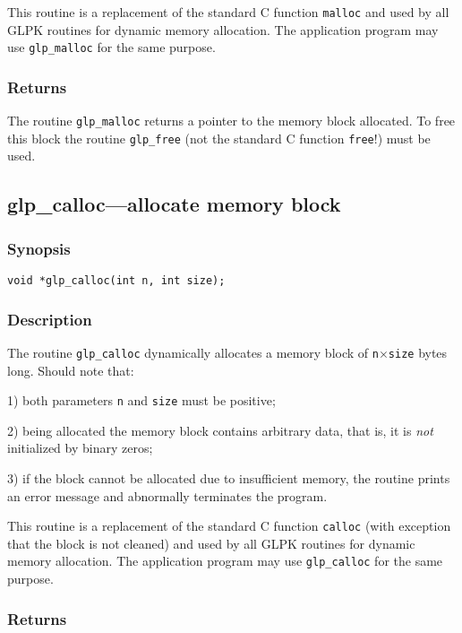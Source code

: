 This routine is a replacement of the standard C function \verb|malloc|
and used by all GLPK routines for dynamic memory allocation. The
application program may use \verb|glp_malloc| for the same purpose.

\subsubsection*{Returns}

The routine \verb|glp_malloc| returns a pointer to the memory block
allocated. To free this block the routine \verb|glp_free| (not the
standard C function \verb|free|!) must be used.

\subsection{glp\_calloc---allocate memory block}

\subsubsection*{Synopsis}

\begin{verbatim}
void *glp_calloc(int n, int size);
\end{verbatim}

\subsubsection*{Description}

The routine \verb|glp_calloc| dynamically allocates a memory block of
\verb|n|$\times$\verb|size| bytes long. Should note that:

1) both parameters \verb|n| and \verb|size| must be positive;

2) being allocated the memory block contains arbitrary data, that is,
it is {\it not} initialized by binary zeros;

3) if the block cannot be allocated due to insufficient memory, the
routine prints an error message and abnormally terminates the program.

This routine is a replacement of the standard C function \verb|calloc|
(with exception that the block is not cleaned) and used by all GLPK
routines for dynamic memory allocation. The application program may use
\verb|glp_calloc| for the same purpose.

\subsubsection*{Returns}

